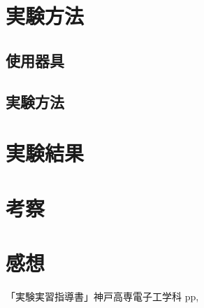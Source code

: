 \documentclass[11pt]{jarticle}
\begin{document}
\section{実験方法}
	\subsection{使用器具}
	\subsection{実験方法}
\section{実験結果}
\section{考察}
\section{感想}
\begin{thebibliography}{99}
「実験実習指導書」神戸高専電子工学科 pp,
\end{thebibliography}
\end{document}

